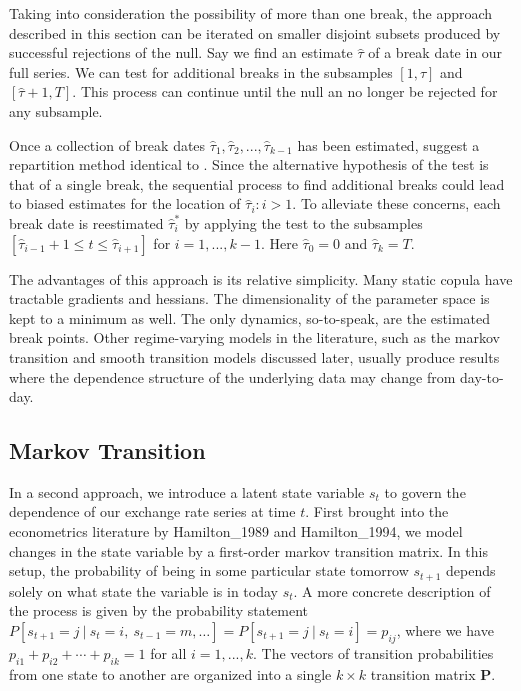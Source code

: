 \documentclass[12pt]{article}
\begin{document}
Taking into consideration the possibility of more than one break, the approach described in this section can be iterated on smaller disjoint subsets produced by successful rejections of the null. Say we find an estimate $\hat{\tau}$ of a break date in our full series. We can test for additional breaks in the subsamples $\left[1, \hat{\tau}\right]$ and $\left[\hat{\tau} + 1, T\right]$. This process can continue until the null an no longer be rejected for any subsample.

Once a collection of break dates $\hat{\tau}_{1},\hat{\tau}_{2},...,\hat{\tau}_{k-1}$ has been estimated, \cite{Dias_and_Embrechts_2009} suggest a repartition method identical to \cite{Bai_1997}. Since the alternative hypothesis of the test is that of a single break, the sequential process to find additional breaks could lead to biased estimates for the location of $\hat{\tau}_{i}:i > 1$. To alleviate these concerns, each break date is reestimated $\hat{\tau}_{i}^{\ast}$ by applying the test to the subsamples $\left[ \hat{\tau}_{i-1}+1\leq t\leq \hat{\tau}_{i+1}\right]$ for $i=1,...,k-1$. Here $\hat{\tau}_{0} = 0$ and $\hat{\tau}_{k} = T$.

The advantages of this approach is its relative simplicity. Many static copula have tractable gradients and hessians. The dimensionality of the parameter space is kept to a minimum as well. The only dynamics, so-to-speak, are the estimated break points. Other regime-varying models in the literature, such as the markov transition and smooth transition models discussed later, usually produce results where the dependence structure of the underlying data may change from day-to-day.

\subsection{Markov Transition}

In a second approach, we introduce a latent state variable $s_{t}$ to govern the dependence of our exchange rate series at time $t$. First brought into the econometrics literature by Hamilton_1989 and Hamilton_1994, we model changes in the state variable by a first-order markov transition matrix. In this setup, the probability of being in some particular state tomorrow $s_{t+1}$ depends solely on what state the variable is in today $s_{t}$. A more concrete description of the process is given by the probability statement $P\left[s_{t + 1} = j~|~s_{t}=i,~s_{t-1} = m,\ldots \right] = P\left[s_{t+1}=j~|~s_{t} = i\right] = p_{ij}$, where we have $p_{i1} + p_{i2} + \cdots + p_{ik}=1$ for all $i = 1,...,k$. The vectors of transition probabilities from one state to another are organized into a single $k\times k$ transition matrix $\mathbf{P}$.
\end{document}
